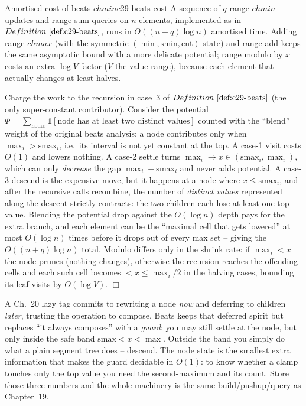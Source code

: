 \begin{theorem}{Amortised cost of beats \(\mathit{chmin}\)}{c29-beats-cost}
A sequence of \(q\) range \(\mathit{chmin}\) updates and range-sum queries on \(n\)
elements, implemented as in \(\defref{c29-beats}\), runs in \(O((n+q)\log n)\)
amortised time.  Adding range \(\mathit{chmax}\) (with the symmetric
\((\min,\mathrm{smin},\mathrm{cnt})\) state) and range add keeps the same
asymptotic bound with a more delicate potential; range modulo by \(x\) costs an
extra \(\log V\) factor (\(V\) the value range), because each element that
actually changes at least halves.
\end{theorem}
\begin{proofbox}
Charge the work to the recursion in case~3 of \(\defref{c29-beats}\) (the only
super-constant contributor).  Consider the potential
\(\Phi=\sum_{\text{nodes}} \mathbb{1}[\text{node has at least two distinct values}]\)
counted with the ``blend'' weight of the original beats analysis: a node
contributes only when \(\max_i>\mathrm{smax}_i\), i.e.\ its interval is not yet
constant at the top.  A case-1 visit costs \(O(1)\) and lowers nothing.  A
case-2 settle turns \(\max_i\to x\in(\mathrm{smax}_i,\max_i)\), which can only
\emph{decrease} the gap \(\max_i-\mathrm{smax}_i\) and never adds potential.  A
case-3 descend is the expensive move, but it happens at a node where \(x\le
\mathrm{smax}_i\), and after the recursive calls recombine, the number of
\emph{distinct values} represented along the descent strictly contracts: the two
children each lose at least one top value.  Blending the potential drop against
the \(O(\log n)\) depth pays for the extra branch, and each element can be the
``maximal cell that gets lowered'' at most \(O(\log n)\) times before it drops
out of every max set -- giving the \(O((n+q)\log n)\) total.  Modulo differs only
in the shrink rate: if \(\max_i<x\) the node prunes (nothing changes), otherwise
the recursion reaches the offending cells and each such cell becomes \(<x\le
\max_i/2\) in the halving cases, bounding its leaf visits by \(O(\log V)\). \(\Box\)
\end{proofbox}

\begin{insightbox}
A Ch.~20 lazy tag commits to rewriting a node \emph{now} and deferring to
children \emph{later}, trusting the operation to compose.  Beats keeps that
deferred spirit but replaces ``it always composes'' with a \emph{guard}: you may
still settle at the node, but only inside the safe band
\(\mathrm{smax}<x<\max\).  Outside the band you simply do what a plain segment
tree does -- descend.  The node state is the smallest extra information that
makes the guard decidable in \(O(1)\): to know whether a clamp touches only the
top value you need the second-maximum and its count.  Store those three numbers
and the whole machinery is the same build/pushup/query as Chapter~19.
\end{insightbox}

